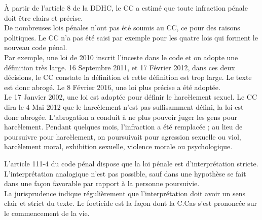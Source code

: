 \documentclass[10pt, a4paper, openany]{book}
\begin{document}
À partir de l'article 8 de la DDHC, le CC a estimé que toute infraction pénale doit être clairs et précise. \\
De nombreuses lois pénales n'ont pas été soumis au CC, ce pour des raisons politiques. Le CC n'a pas été saisi par exemple pour les quatre lois qui forment le nouveau code pénal. \\
Par exemple, une loi de 2010 inscrit l'inceste dans le code et on adopte une définition très large. 16 Septembre 2011, et 17 Février 2012, dans ces deux décisions, le CC constate la définition et cette définition est trop large. Le texte est donc abrogé. Le 8 Février 2016, une loi plus précise a été adoptée. \\
Le 17 Janvier 2002, une loi est adoptée pour définir le harcèlement sexuel. Le CC dira le 4 Mai 2012 que le harcèlement n'est pas suffisamment défini, la loi est donc abrogée. L'abrogation a conduit à ne plus pouvoir juger les gens pour harcèlement. Pendant quelques mois, l'infraction a été remplacée ; au lieu de poursuivre pour harcèlement, on poursuivait pour agression sexuelle ou viol, harcèlement moral, exhibition sexuelle, violence morale ou psychologique.


L'article 111-4 du code pénal dispose que la loi pénale est d'interprétation stricte. L'interprétation analogique n'est pas possible, sauf dans une hypothèse se fait dans une façon favorable par rapport à la personne poursuivie. \\
La jurisprudence indique régulièrement que l'interprétation doit avoir un sens clair et strict du texte. Le foeticide est la façon dont la C.Cas s'est prononcée sur le commencement de la vie.
\end{document}

